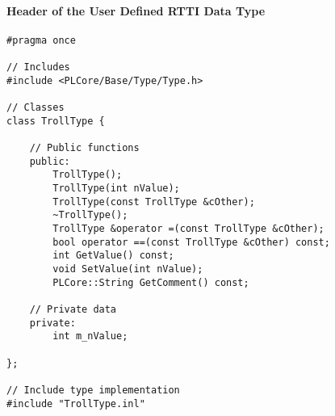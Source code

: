 \paragraph{Header of the User Defined RTTI Data Type}
\begin{lstlisting}[label=Code:UserDefinedRTTIDataTypeHeader,caption={Header of the user defined RTTI data type}]
#pragma once

// Includes
#include <PLCore/Base/Type/Type.h>

// Classes
class TrollType {

	// Public functions
	public:
		TrollType();
		TrollType(int nValue);
		TrollType(const TrollType &cOther);
		~TrollType();
		TrollType &operator =(const TrollType &cOther);
		bool operator ==(const TrollType &cOther) const;
		int GetValue() const;
		void SetValue(int nValue);
		PLCore::String GetComment() const;

	// Private data
	private:
		int m_nValue;

};

// Include type implementation
#include "TrollType.inl"
\end{lstlisting}


